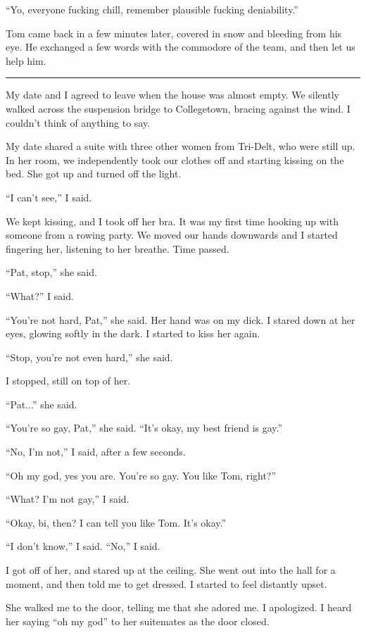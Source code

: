 ``Yo, everyone fucking chill, remember plausible fucking deniability.''

Tom came back in a few minutes later, covered in snow and bleeding from his eye.
He exchanged a few words with the commodore of the team, and then let us help
him.

\plainfancybreak{12pt}{2}{}

My date and I agreed to leave when the house was almost empty.  We silently
walked across the suspension bridge to Collegetown, bracing against the wind.  I
couldn't think of anything to say.

My date shared a suite with three other women from Tri-Delt, who were still up.
In her room, we independently took our clothes off and starting kissing on the
bed.  She got up and turned off the light.

``I can't see,'' I said.

We kept kissing, and I took off her bra.  It was my first time hooking up with
someone from a rowing party.  We moved our hands downwards and I started
fingering her, listening to her breathe.  Time passed.

``Pat, stop,'' she said.

``What?'' I said.

``You're not hard, Pat,'' she said.  Her hand was on my dick.  I stared down at
her eyes, glowing softly in the dark.  I started to kiss her again.

``Stop, you're not even hard,'' she said.

I stopped, still on top of her.

``Pat...'' she said.

``You're so gay, Pat,'' she said.  ``It's okay, my best friend is gay.''

``No, I'm not,'' I said, after a few seconds.

``Oh my god, yes you are.  You're so gay.  You like Tom, right?''

``What?  I'm not gay,'' I said.

``Okay, bi, then?  I can tell you like Tom.  It's okay.''

``I don't know,'' I said.  ``No,'' I said.

I got off of her, and stared up at the ceiling.  She went out into the hall for
a moment, and then told me to get dressed.  I started to feel distantly upset.

She walked me to the door, telling me that she adored me.  I apologized.  I
heard her saying ``oh my god'' to her suitemates as the door closed.

